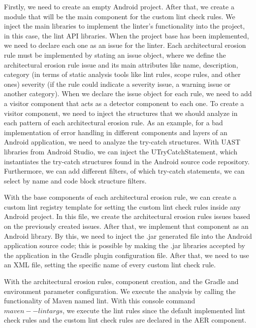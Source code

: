 Firstly, we need to create an empty Android project. After that, we create a module that will be the main component for the custom lint check rules. We inject the main libraries to implement the linter's functionality into the project, in this case, the lint API libraries. When the project base has been implemented, we need to declare each one as an issue for the linter. Each architectural erosion rule must be implemented by stating an issue object, where we define the architectural erosion rule issue and its main attributes like name, description, category (in terms of static analysis tools like lint rules, scope rules, and other ones) severity (if the rule could indicate a severity issue, a warning issue or another category). When we declare the issue object for each rule, we need to add a visitor component that acts as a detector component to each one. To create a visitor component, we need to inject the structures that we should analyze in each pattern of each architectural erosion rule. As an example, for a bad implementation of error handling in different components and layers of an Android application, we need to analyze the try-catch structures. With UAST libraries from Android Studio, we can inject the UTryCatchStatement, which instantiates the try-catch structures found in the Android source code repository. Furthermore, we can add different filters, of which try-catch statements, we can select by name and code block structure filters.

With the base components of each architectural erosion rule, we can create a custom lint registry template for setting the custom lint check rules inside any Android project. In this file, we create the architectural erosion rules issues based on the previously created issues. After that, we implement that component as an Android library. By this, we need to inject the .jar generated file into the Android application source code; this is possible by making the .jar libraries accepted by the application in the Gradle plugin configuration file.  After that, we need to use an XML file, setting the specific name of every custom lint check rule.

With the architectural erosion rules, component creation, and the Gradle and environment parameter configuration. We execute the analysis by calling the functionality of Maven named lint. With this console command $maven --lint args$, we execute the lint rules since the default implemented lint check rules and the custom lint check rules are declared in the AER component.

